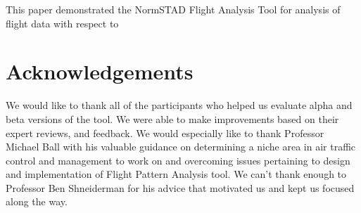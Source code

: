 \documentclass{sig-alternate}
\begin{document}
This paper demonstrated the NormSTAD Flight Analysis Tool for analysis of flight data
with respect to 

\section{Acknowledgements}
\label{sec-acknowledgements}
We would like to thank all of the
participants who helped us evaluate alpha and
beta versions of the tool. We were able to make
improvements based on their expert reviews,
and feedback. We would especially like to thank
Professor Michael Ball with his valuable guidance
on determining a niche area in air traffic control
and management to work on and overcoming issues
pertaining to design and implementation of Flight
Pattern Analysis tool. We can’t thank enough to
Professor Ben Shneiderman for his advice that
motivated us and kept us focused along the way.


\begin{small}

\end{small}
\end{document}
